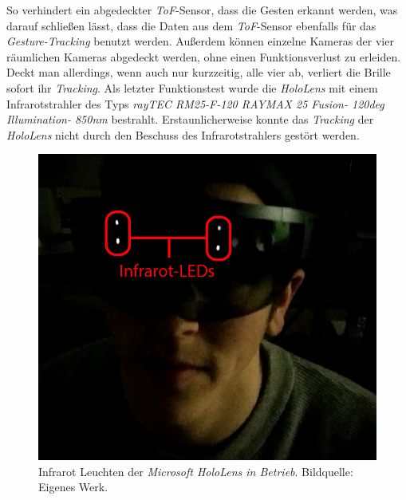 So verhindert ein abgedeckter \textit{ToF}-Sensor, dass die Gesten erkannt werden, was darauf schließen lässt, dass die Daten aus dem \textit{ToF}-Sensor ebenfalls für das \textit{Gesture-Tracking} benutzt werden. Außerdem können einzelne Kameras der vier räumlichen Kameras abgedeckt werden, ohne einen Funktionsverlust zu erleiden. Deckt man allerdings, wenn auch nur kurzzeitig, alle vier ab, verliert die Brille sofort ihr \textit{Tracking}. Als letzter Funktionstest wurde die \textit{HoloLens} mit einem Infrarotstrahler des Typs \textit{rayTEC RM25-F-120 RAYMAX 25 Fusion- 120deg Illumination- 850nm} bestrahlt. Erstaunlicherweise konnte das \textit{Tracking} der \textit{HoloLens} nicht durch den Beschuss des Infrarotstrahlers gestört werden.
\begin{figure}[H]
	\centering
	\includegraphics[width=.5\textwidth]{figuren/holoLens_ir_led}
	\caption{Infrarot Leuchten der \textit{Microsoft HoloLens in Betrieb}. Bildquelle: Eigenes Werk.}
	\label{fig:holoLens_IR_LED}
\end{figure}
